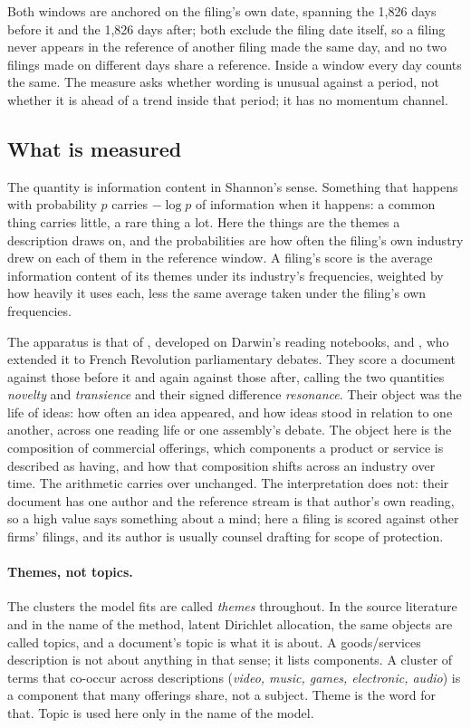Both windows are anchored on the filing's own date, spanning the 1,826
days before it
and the 1,826 days after; both exclude the filing date itself, so a filing
never appears in the reference of another filing made the same day, and no
two filings made on different days share a reference. Inside a window every day counts the same. The measure asks whether
wording is unusual against a period, not whether it is ahead of a trend
inside that period; it has no momentum channel.

\subsection{What is measured}

The quantity is information content in Shannon's sense. Something that
happens with probability $p$ carries $-\log p$ of information when it
happens: a common thing carries little, a rare thing a lot. Here the things
are the themes a description draws on, and the probabilities are how often
the filing's own industry drew on each of them in the reference window. A
filing's score is the average information content of its themes under its
industry's frequencies, weighted by how heavily it uses each, less the same
average taken under the filing's own frequencies.

The apparatus is that of \citet{Murdock2017}, developed on Darwin's reading
notebooks, and \citet{Barron2018}, who extended it to French Revolution
parliamentary debates. They score a document against those before it and
again against those after, calling the two quantities \emph{novelty} and
\emph{transience} and their signed difference \emph{resonance}. Their object
was the life of ideas: how often an idea appeared, and how ideas stood in
relation to one another, across one reading life or one assembly's debate.
The object here is the composition of commercial offerings, which components
a product or service is described as having, and how that composition shifts
across an industry over time. The arithmetic carries over unchanged. The
interpretation does not: their document has one author and the reference
stream is that author's own reading, so a high value says something about a
mind; here a filing is scored against other firms' filings, and its author is
usually counsel drafting for scope of protection.

\paragraph{Themes, not topics.} The clusters the model fits are called
\emph{themes} throughout. In the source literature and in the name of the
method, latent Dirichlet allocation, the same objects are called topics, and
a document's topic is what it is about. A goods/services description is not
about anything in that sense; it lists components. A cluster of terms that
co-occur across descriptions (\emph{video, music, games, electronic,
audio}) is a component that many offerings share, not a subject. Theme is
the word for that. Topic is used here only in the name of the model.

